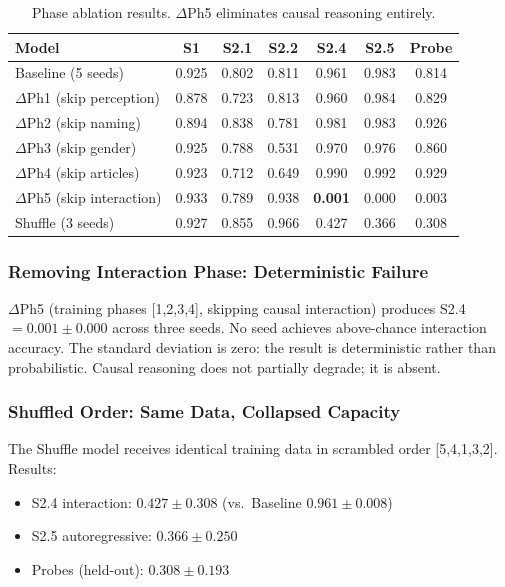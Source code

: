 \documentclass{article}
\begin{document}
\begin{table}[htbp]
\centering
\small
\begin{tabular}{lcccccc}
\toprule
Model & S1 & S2.1 & S2.2 & S2.4 & S2.5 & Probe \\
\midrule
Baseline (5 seeds) & 0.925 & 0.802 & 0.811 & 0.961 & 0.983 & 0.814 \\
$\Delta$Ph1 (skip perception) & 0.878 & 0.723 & 0.813 & 0.960 & 0.984 & 0.829 \\
$\Delta$Ph2 (skip naming) & 0.894 & 0.838 & 0.781 & 0.981 & 0.983 & 0.926 \\
$\Delta$Ph3 (skip gender) & 0.925 & 0.788 & 0.531 & 0.970 & 0.976 & 0.860 \\
$\Delta$Ph4 (skip articles) & 0.923 & 0.712 & 0.649 & 0.990 & 0.992 & 0.929 \\
$\Delta$Ph5 (skip interaction) & 0.933 & 0.789 & 0.938 & \textbf{0.001} & 0.000 & 0.003 \\
Shuffle (3 seeds) & 0.927 & 0.855 & 0.966 & 0.427 & 0.366 & 0.308 \\
\bottomrule
\end{tabular}
\caption{Phase ablation results. $\Delta$Ph5 eliminates causal reasoning entirely.}
\label{tab:ablation}
\end{table}

\subsubsection{Removing Interaction Phase: Deterministic Failure}

$\Delta$Ph5 (training phases [1,2,3,4], skipping causal interaction) produces S2.4 $= 0.001 \pm 0.000$ across three seeds. No seed achieves above-chance interaction accuracy. The standard deviation is zero: the result is deterministic rather than probabilistic. Causal reasoning does not partially degrade; it is absent.

\subsubsection{Shuffled Order: Same Data, Collapsed Capacity}

The Shuffle model receives identical training data in scrambled order [5,4,1,3,2]. Results:
\begin{itemize}
    \item S2.4 interaction: $0.427 \pm 0.308$ (vs.\ Baseline $0.961 \pm 0.008$)
    \item S2.5 autoregressive: $0.366 \pm 0.250$
    \item Probes (held-out): $0.308 \pm 0.193$
\end{itemize}
\end{document}
